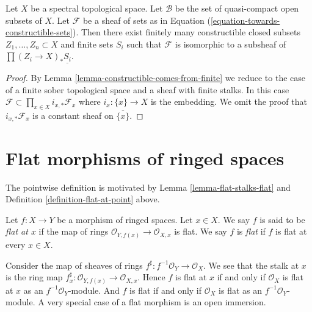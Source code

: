 \begin{lemma}
\label{lemma-constructible-in-constant}
Let $X$ be a spectral topological space. Let $\mathcal{B}$ be
the set of quasi-compact open subsets of $X$.
Let $\mathcal{F}$ be a sheaf of sets as in
Equation (\ref{equation-towards-constructible-sets}).
Then there exist finitely many constructible closed subsets
$Z_1, \ldots, Z_n \subset X$ and finite sets $S_i$
such that $\mathcal{F}$ is isomorphic to a subsheaf of
$\prod (Z_i \to X)_*\underline{S_i}$.
\end{lemma}

\begin{proof}
By Lemma \ref{lemma-constructible-comes-from-finite}
we reduce to the case of a finite sober topological space
and a sheaf with finite stalks.
In this case $\mathcal{F} \subset \prod_{x \in X} i_{x, *}\mathcal{F}_x$
where $i_x : \{x\} \to X$ is the embedding. We omit the proof
that $i_{x, *}\mathcal{F}_x$ is a constant sheaf on $\overline{\{x\}}$.
\end{proof}










\section{Flat morphisms of ringed spaces}
\label{section-flat-morphisms}

\noindent
The pointwise definition is motivated by
Lemma \ref{lemma-flat-stalks-flat}
and
Definition \ref{definition-flat-at-point}
above.

\begin{definition}
\label{definition-flat-morphism}
Let $f : X \to Y$ be a morphism of ringed spaces.
Let $x \in X$. We say $f$ is said to be {\it flat at $x$}
if the map of rings $\mathcal{O}_{Y, f(x)} \to \mathcal{O}_{X, x}$ is flat.
We say $f$ is {\it flat} if $f$ is flat at every $x \in X$.
\end{definition}

\noindent
Consider the map of sheaves of rings
$f^\sharp : f^{-1}\mathcal{O}_Y \to \mathcal{O}_X$.
We see that the stalk at $x$ is the ring map
$f^\sharp_x : \mathcal{O}_{Y, f(x)} \to \mathcal{O}_{X, x}$.
Hence $f$ is flat at $x$ if and only if $\mathcal{O}_X$ is flat at $x$
as an $f^{-1}\mathcal{O}_Y$-module. And $f$ is flat if and only if
$\mathcal{O}_X$ is flat as an $f^{-1}\mathcal{O}_Y$-module.
A very special case of a flat morphism is an open immersion.

